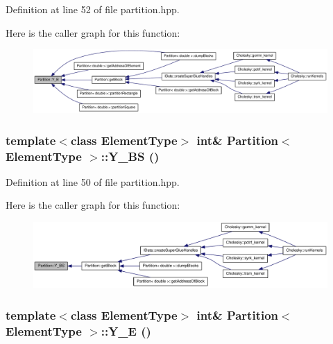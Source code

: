 Definition at line 52 of file partition.hpp.

Here is the caller graph for this function:\nopagebreak
\begin{figure}[H]
\begin{center}
\leavevmode
\includegraphics[width=420pt]{class_partition_a99642b7ce0d0385ccbaa821918e816f0_icgraph}
\end{center}
\end{figure}
\hypertarget{class_partition_ad122861c613d170ffb610194b4bb3850}{
\subsubsection[{Y\_\-BS}]{\setlength{\rightskip}{0pt plus 5cm}template$<$class ElementType$>$ int\& {\bf Partition}$<$ ElementType $>$::Y\_\-BS ()}}
\label{class_partition_ad122861c613d170ffb610194b4bb3850}


Definition at line 50 of file partition.hpp.

Here is the caller graph for this function:\nopagebreak
\begin{figure}[H]
\begin{center}
\leavevmode
\includegraphics[width=396pt]{class_partition_ad122861c613d170ffb610194b4bb3850_icgraph}
\end{center}
\end{figure}
\hypertarget{class_partition_a3721344cfda08fbf4f0ee806082d0ac3}{
\subsubsection[{Y\_\-E}]{\setlength{\rightskip}{0pt plus 5cm}template$<$class ElementType$>$ int\& {\bf Partition}$<$ ElementType $>$::Y\_\-E ()}}
\label{class_partition_a3721344cfda08fbf4f0ee806082d0ac3}


